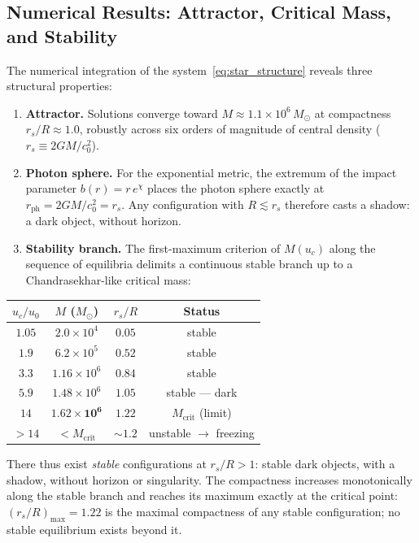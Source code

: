\documentclass[11pt,a4paper]{article}
\theoremstyle{plain}
\theoremstyle{remark}
\begin{document}
\subsection{Numerical Results: Attractor, Critical Mass, and Stability}
The numerical integration of the system~\eqref{eq:star_structure} reveals three structural properties:
\begin{enumerate}
    \item \textbf{Attractor.} Solutions converge toward $M \approx 1.1\times10^{6}\,M_\odot$ at compactness $r_s/R \approx 1.0$, robustly across six orders of magnitude of central density ($r_s \equiv 2GM/c_0^2$).
    \item \textbf{Photon sphere.} For the exponential metric, the extremum of the impact parameter $b(r) = r\,e^{\chi}$ places the photon sphere exactly at $r_{\text{ph}} = 2GM/c_0^2 = r_s$. Any configuration with $R \lesssim r_s$ therefore casts a shadow: a dark object, without horizon.
    \item \textbf{Stability branch.} The first-maximum criterion of $M(u_c)$ along the sequence of equilibria delimits a continuous stable branch up to a Chandrasekhar-like critical mass:
\end{enumerate}

\begin{center}
\begin{tabular}{cccc}
\toprule
$u_c/u_0$ & $M$ ($M_\odot$) & $r_s/R$ & Status \\
\midrule
$1.05$ & $2.0\times10^{4}$ & $0.05$ & stable \\
$1.9$ & $6.2\times10^{5}$ & $0.52$ & stable \\
$3.3$ & $1.16\times10^{6}$ & $0.84$ & stable \\
$5.9$ & $1.48\times10^{6}$ & $1.05$ & stable --- dark \\
$14$ & $\mathbf{1.62\times10^{6}}$ & $1.22$ & $M_{\text{crit}}$ (limit) \\
$>14$ & $< M_{\text{crit}}$ & $\sim1.2$ & unstable $\to$ freezing \\
\bottomrule
\end{tabular}
\end{center}

There thus exist \emph{stable} configurations at $r_s/R > 1$: stable dark objects, with a shadow, without horizon or singularity. The compactness increases monotonically along the stable branch and reaches its maximum exactly at the critical point: $\left(r_s/R\right)_{\max} = 1.22$ is the maximal compactness of any stable configuration; no stable equilibrium exists beyond it.
\end{document}
